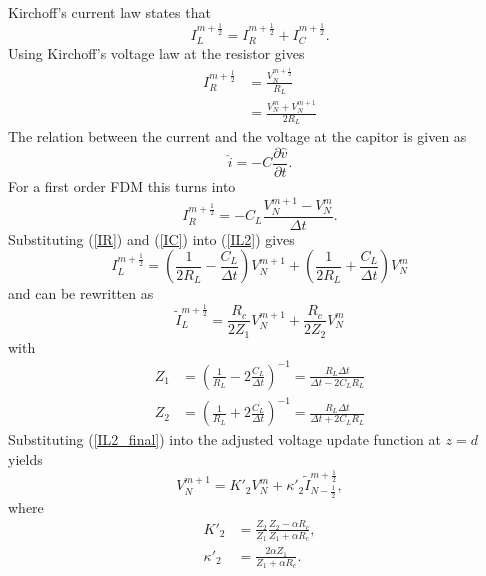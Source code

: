 Kirchoff's current law states that
\begin{equation}
    I^{m+\frac{1}{2}}_{L} = I^{m+\frac{1}{2}}_{R} + I^{m+\frac{1}{2}}_{C}.
    \label{IL2}
\end{equation}
Using Kirchoff's voltage law at the resistor gives
\begin{align}
    I^{m+\frac{1}{2}}_{R} & = \frac{V^{m+\frac{1}{2}}_{N}}{R_{L}}\\
    & = \frac{V^{m}_{N}+V^{m+1}_{N}}{2R_{L}}
    \label{IR}
\end{align}
The relation between the current and the voltage at the capitor is given as
\begin{equation}
    \hat{i} = -C\frac{\partial \hat{v}}{\partial t}.
\end{equation}
For a first order FDM this turns into
\begin{equation}
    I^{m+\frac{1}{2}}_{R} = -C_{L}\frac{V^{m+1}_{N} - V^{m}_{N}}{\Delta t}.
    \label{IC}
\end{equation}
Substituting (\ref{IR}) and (\ref{IC}) into (\ref{IL2}) gives
\begin{equation}
    I^{m+\frac{1}{2}}_{L} = \left(\frac{1}{2R_{L}}-\frac{C_{L}}{\Delta t}\right)V^{m+1}_N + \left(\frac{1}{2R_{L}}+\frac{C_{L}}{\Delta t}\right)V^{m}_N
\end{equation}
and can be rewritten as
\begin{equation}
    \tilde{I}^{m+\frac{1}{2}}_{L} = \frac{R_{c}}{2Z_{1}}V^{m+1}_N + \frac{R_{c}}{2Z_{2}}V^{m}_N
    \label{IL2_final}
\end{equation}
with
\begin{align}
    Z_{1} &= \left(\frac{1}{R_{L}}-2\frac{C_{L}}{\Delta t}\right)^{-1} = \frac{R_{L}\Delta t}{\Delta t - 2 C_{L}R_{L}} \nonumber\\
    Z_{2} &= \left(\frac{1}{R_{L}}+2\frac{C_{L}}{\Delta t}\right)^{-1} = \frac{R_{L}\Delta t}{\Delta t + 2 C_{L}R_{L}} \label{eq:Z}
\end{align}
Substituting (\ref{IL2_final}) into the adjusted voltage update function at $z=d$ yields
\begin{equation}
    V^{m+1}_{N} = K'_{2}V^{m}_N + \kappa'_{2}\tilde{I}^{m+\frac{1}{2}}_{N-\frac{1}{2}},
\end{equation}
where
\begin{align}
    K'_{2} & = \frac{Z_{2}}{Z_{1}}\frac{Z_{2}-\alpha R_{c}}{Z_{1}+\alpha R_{c}},\\
    \kappa'_{2} & = \frac{2\alpha Z_{1}}{Z_{1}+\alpha R_{c}}.
\end{align}

